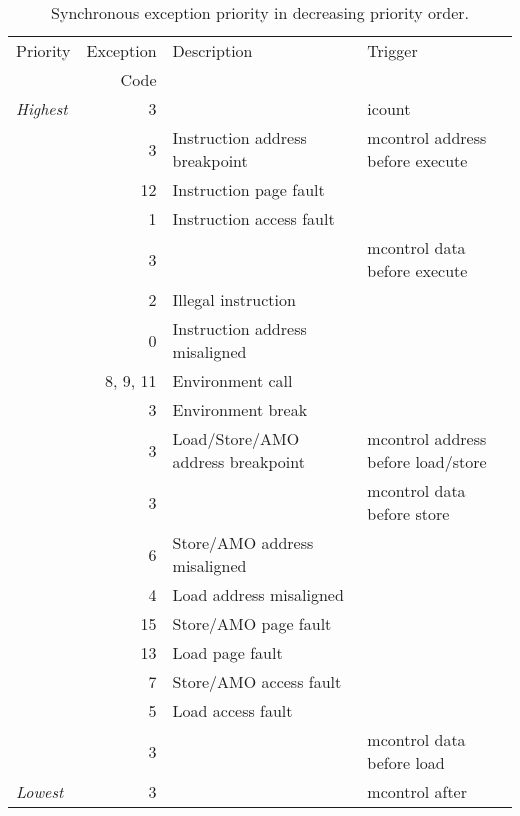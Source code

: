 \begin{table}[H]
\centering
\label{tab:priority}
\begin{tabular}{|l|r|l|l|}
  \hline
  Priority      & Exception & Description & Trigger \\
                &      Code &             & \\
  \hline
  {\em Highest} &          3 & & icount \\ \hline
                &          3 & Instruction address breakpoint & mcontrol address before execute \\ \hline
                &         12 & Instruction page fault & \\ \hline
                &          1 & Instruction access fault & \\ \hline
                &          3 & & mcontrol data before execute \\ \hline
                &          2 & Illegal instruction & \\
                &          0 & Instruction address misaligned & \\
                &   8, 9, 11 & Environment call & \\
                &          3 & Environment break & \\
                &          3 & Load/Store/AMO address breakpoint & mcontrol address before load/store \\
                &          3 & & mcontrol data before store \\ \hline
                &          6 & Store/AMO address misaligned & \\
                &          4 & Load address misaligned & \\ \hline
                &         15 & Store/AMO page fault & \\
                &         13 & Load page fault & \\ \hline
                &          7 & Store/AMO access fault & \\
                &          5 & Load access fault & \\ \hline
                &          3 & & mcontrol data before load \\
  {\em Lowest}  &          3 & & mcontrol after \\
  \hline
\end{tabular}
\caption{Synchronous exception priority in decreasing priority order.}
\end{table}

